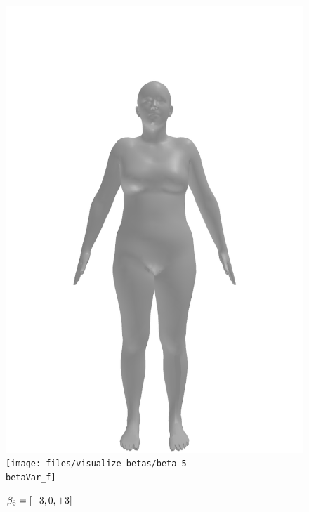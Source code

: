 \begin{figure}[ht!]
\begin{minipage}[b]{\textwidth}
        \includegraphics[width=\imgWidth]{files/visualize_betas/baseline_f}
        \texttt{[image: files/visualize\_betas/beta\_5\_\\betaVar\_f]}
        \caption{$\beta_6 = [-3, 0, +3]$}
    \end{minipage}
\end{figure}

